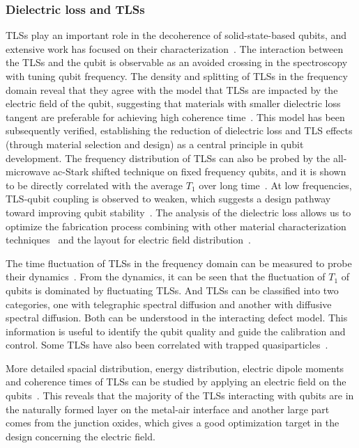 \documentclass[a4paper,onecolumn,11pt,unpublished]{quantumarticle}
\begin{document}
\subsubsection{Dielectric loss and TLSs}
TLSs play an important role in the decoherence of solid-state-based qubits, and extensive work has focused on their characterization~\cite{Muller2019Towards}. The interaction between the TLSs and the qubit is observable as an avoided crossing in the spectroscopy with tuning qubit frequency. The density and splitting of TLSs in the frequency domain reveal that they agree with the model that TLSs are impacted by the electric field of the qubit, suggesting that materials with smaller dielectric loss tangent are preferable for achieving high coherence time~\cite{Martinis2005Decoherence}. This model has been subsequently verified, establishing the reduction of dielectric loss and TLS effects (through material selection and design) as a central principle in qubit development. The frequency distribution of TLSs can also be probed by the all-microwave ac-Stark shifted technique on fixed frequency qubits, and it is shown to be directly correlated with the average $T_1$ over long time~\cite{Carroll2022Dynamics}. At low frequencies, TLS-qubit coupling is observed to weaken, which suggests a design pathway toward improving qubit stability~\cite{Sun2023Characterization}. The analysis of the dielectric loss allows us to optimize the fabrication process combining with other material characterization techniques~\cite{Chayanun2024Characterization} and the layout for electric field distribution~\cite{Deng2023Titanium,Ganjam2023Improving}.

The time fluctuation of TLSs in the frequency domain can be measured to probe their dynamics~\cite{Burnett2019Decoherence,Klimov2018Fluctuations,Bejanin2021Interacting}. From the dynamics, it can be seen that the fluctuation of $T_1$ of qubits is dominated by fluctuating TLSs. And TLSs can be classified into two categories, one with telegraphic spectral diffusion and another with diffusive spectral diffusion. Both can be understood in the interacting defect model. This information is useful to identify the qubit quality and guide the calibration and control. Some TLSs have also been correlated with trapped quasiparticles~\cite{deGraaf2020Twolevel}.

More detailed spacial distribution, energy distribution, electric dipole moments and coherence times of TLSs can be studied by applying an electric field on the qubits~\cite{Grabovskij2012Strain,Lisenfeld2016Decoherence,Lisenfeld2019Electric,Bilmes2020Resolving,Bilmes2022Probing,Lisenfeld2015Observation}. This reveals that the majority of the TLSs interacting with qubits are in the naturally formed  layer on the metal-air interface and another large part comes from the junction oxides, which gives a good optimization target in the design concerning the electric field. 
\end{document}
